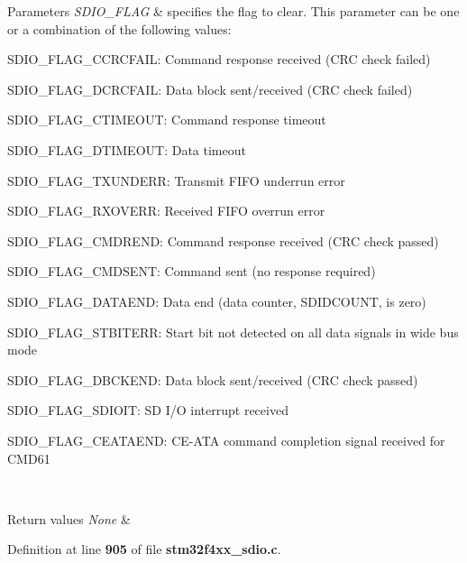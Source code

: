 \begin{DoxyParams}{Parameters}
{\em S\+D\+I\+O\+\_\+\+F\+L\+AG} & specifies the flag to clear. This parameter can be one or a combination of the following values\+: \begin{DoxyItemize}
\item S\+D\+I\+O\+\_\+\+F\+L\+A\+G\+\_\+\+C\+C\+R\+C\+F\+A\+IL\+: Command response received (C\+RC check failed) \item S\+D\+I\+O\+\_\+\+F\+L\+A\+G\+\_\+\+D\+C\+R\+C\+F\+A\+IL\+: Data block sent/received (C\+RC check failed) \item S\+D\+I\+O\+\_\+\+F\+L\+A\+G\+\_\+\+C\+T\+I\+M\+E\+O\+UT\+: Command response timeout \item S\+D\+I\+O\+\_\+\+F\+L\+A\+G\+\_\+\+D\+T\+I\+M\+E\+O\+UT\+: Data timeout \item S\+D\+I\+O\+\_\+\+F\+L\+A\+G\+\_\+\+T\+X\+U\+N\+D\+E\+RR\+: Transmit F\+I\+FO underrun error \item S\+D\+I\+O\+\_\+\+F\+L\+A\+G\+\_\+\+R\+X\+O\+V\+E\+RR\+: Received F\+I\+FO overrun error \item S\+D\+I\+O\+\_\+\+F\+L\+A\+G\+\_\+\+C\+M\+D\+R\+E\+ND\+: Command response received (C\+RC check passed) \item S\+D\+I\+O\+\_\+\+F\+L\+A\+G\+\_\+\+C\+M\+D\+S\+E\+NT\+: Command sent (no response required) \item S\+D\+I\+O\+\_\+\+F\+L\+A\+G\+\_\+\+D\+A\+T\+A\+E\+ND\+: Data end (data counter, S\+D\+I\+D\+C\+O\+U\+NT, is zero) \item S\+D\+I\+O\+\_\+\+F\+L\+A\+G\+\_\+\+S\+T\+B\+I\+T\+E\+RR\+: Start bit not detected on all data signals in wide bus mode \item S\+D\+I\+O\+\_\+\+F\+L\+A\+G\+\_\+\+D\+B\+C\+K\+E\+ND\+: Data block sent/received (C\+RC check passed) \item S\+D\+I\+O\+\_\+\+F\+L\+A\+G\+\_\+\+S\+D\+I\+O\+IT\+: SD I/O interrupt received \item S\+D\+I\+O\+\_\+\+F\+L\+A\+G\+\_\+\+C\+E\+A\+T\+A\+E\+ND\+: C\+E-\/\+A\+TA command completion signal received for C\+M\+D61 \end{DoxyItemize}
\\
\hline
\end{DoxyParams}

\begin{DoxyRetVals}{Return values}
{\em None} & \\
\hline
\end{DoxyRetVals}


Definition at line \textbf{ 905} of file \textbf{ stm32f4xx\+\_\+sdio.\+c}.


